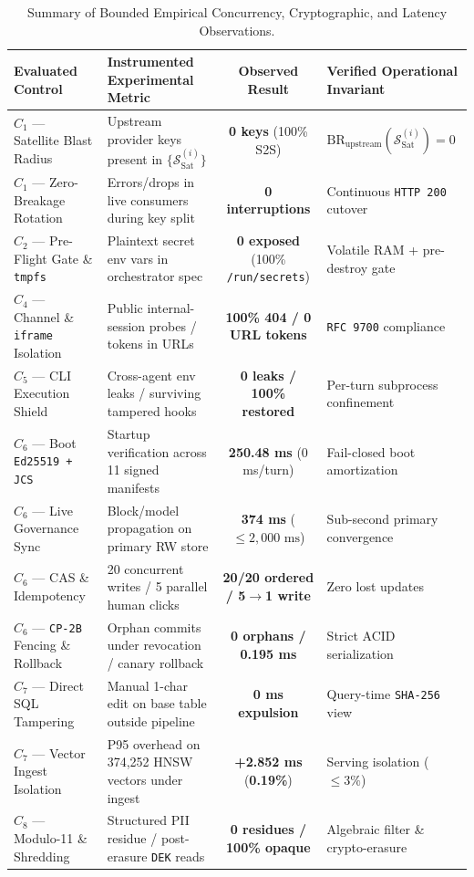 \documentclass[10pt,twocolumn]{article}
\begin{document}
\begin{table}[t]
\centering
\caption{Summary of Bounded Empirical Concurrency, Cryptographic, and Latency Observations.}
\label{tab:empirical}
\footnotesize
\begin{tabularx}{\textwidth}{@{}l Y c l@{}}
\toprule
\textbf{Evaluated Control} & \textbf{Instrumented Experimental Metric} & \textbf{Observed Result} & \textbf{Verified Operational Invariant} \\
\midrule
$C_1$ --- Satellite Blast Radius & Upstream provider keys present in $\{\mathcal{S}_{\mathrm{Sat}}^{(i)}\}$ & \textbf{0 keys} (100\% S2S) & $\mathrm{BR}_{\mathrm{upstream}}(\mathcal{S}_{\mathrm{Sat}}^{(i)}) = 0$ \\
$C_1$ --- Zero-Breakage Rotation & Errors/drops in live consumers during key split & \textbf{0 interruptions} & Continuous \texttt{HTTP 200} cutover \\
$C_2$ --- Pre-Flight Gate \& \texttt{tmpfs} & Plaintext secret env vars in orchestrator spec & \textbf{0 exposed} (100\% \texttt{/run/secrets}) & Volatile RAM + pre-destroy gate \\
$C_4$ --- Channel \& \texttt{iframe} Isolation & Public internal-session probes / tokens in URLs & \textbf{100\% 404 / 0 URL tokens} & \texttt{RFC 9700} compliance \\
$C_5$ --- CLI Execution Shield & Cross-agent env leaks / surviving tampered hooks & \textbf{0 leaks / 100\% restored} & Per-turn subprocess confinement \\
$C_6$ --- Boot \texttt{Ed25519 + JCS} & Startup verification across 11 signed manifests & \textbf{250.48 ms} (0 ms/turn) & Fail-closed boot amortization \\
$C_6$ --- Live Governance Sync & Block/model propagation on primary RW store & \textbf{374 ms} ($\le 2,000\text{ ms}$) & Sub-second primary convergence \\
$C_6$ --- CAS \& Idempotency & 20 concurrent writes / 5 parallel human clicks & \textbf{20/20 ordered / 5$\to$1 write} & Zero lost updates \\
$C_6$ --- \texttt{CP-2B} Fencing \& Rollback & Orphan commits under revocation / canary rollback & \textbf{0 orphans / 0.195 ms} & Strict ACID serialization \\
$C_7$ --- Direct SQL Tampering & Manual 1-char edit on base table outside pipeline & \textbf{0 ms expulsion} & Query-time \texttt{SHA-256} view \\
$C_7$ --- Vector Ingest Isolation & P95 overhead on 374,252 HNSW vectors under ingest & \textbf{+2.852 ms} (\textbf{0.19\%}) & Serving isolation ($\le 3\%$) \\
$C_8$ --- Modulo-11 \& Shredding & Structured PII residue / post-erasure \texttt{DEK} reads & \textbf{0 residues / 100\% opaque} & Algebraic filter \& crypto-erasure \\
\bottomrule
\end{tabularx}
\end{table}
\end{document}
